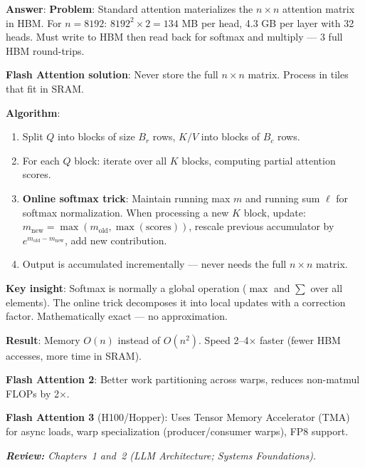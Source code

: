 \begin{questionbox}
\textbf{Answer}: \textbf{Problem}: Standard attention materializes the $n \times n$ attention matrix in HBM. For $n=8192$: $8192^2 \times 2 = 134$ MB per head, 4.3 GB per layer with 32 heads. Must write to HBM then read back for softmax and multiply --- 3 full HBM round-trips.

\textbf{Flash Attention solution}: Never store the full $n \times n$ matrix. Process in tiles that fit in SRAM.

\textbf{Algorithm}:

\begin{enumerate}
  \item Split $Q$ into blocks of size $B_r$ rows, $K/V$ into blocks of $B_c$ rows.
  \item For each $Q$ block: iterate over all $K$ blocks, computing partial attention scores.
  \item \textbf{Online softmax trick}: Maintain running max $m$ and running sum $\ell$ for softmax normalization. When processing a new $K$ block, update: $m_\text{new} = \max(m_\text{old}, \max(\text{scores}))$, rescale previous accumulator by $e^{m_\text{old} - m_\text{new}}$, add new contribution.
  \item Output is accumulated incrementally --- never needs the full $n \times n$ matrix.
\end{enumerate}

\textbf{Key insight}: Softmax is normally a global operation ($\max$ and $\sum$ over all elements). The online trick decomposes it into local updates with a correction factor. Mathematically exact --- no approximation.

\textbf{Result}: Memory $O(n)$ instead of $O(n^2)$. Speed 2--4$\times$ faster (fewer HBM accesses, more time in SRAM).

\textbf{Flash Attention 2}: Better work partitioning across warps, reduces non-matmul FLOPs by 2$\times$.

\textbf{Flash Attention 3} (H100/Hopper): Uses Tensor Memory Accelerator (TMA) for async loads, warp specialization (producer/consumer warps), FP8 support.

\emph{\textbf{Review:} Chapters~1 and~2 (LLM Architecture; Systems Foundations).}
\end{questionbox}

